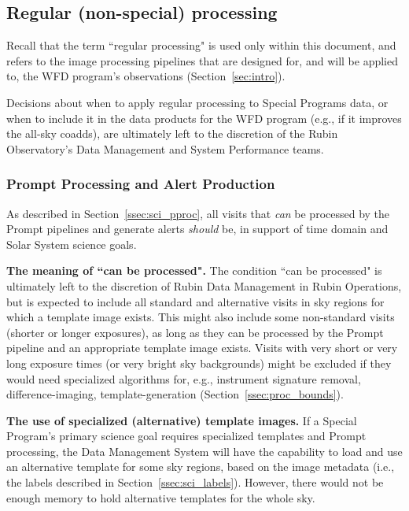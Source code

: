 \subsection{Regular (non-special) processing}\label{ssec:proc_reg}

Recall that the term ``regular processing" is used only within this document,
and refers to the image processing pipelines that are designed for, 
and will be applied to, the WFD program's observations (Section~\ref{sec:intro}).

Decisions about when to apply regular processing to Special Programs data,
or when to include it in the data products for the WFD program 
(e.g., if it improves the all-sky coadds), 
are ultimately left to the discretion of the Rubin Observatory's 
Data Management and System Performance teams.


\subsubsection{Prompt Processing and Alert Production}\label{sssec:proc_reg_prompt}

As described in Section~\ref{ssec:sci_pproc}, 
all visits that \emph{can} be processed by the Prompt pipelines and generate 
alerts \emph{should} be, in support of time domain and Solar System science goals.

\textbf{The meaning of ``can be processed".}
The condition ``can be processed" is ultimately left to the discretion of
Rubin Data Management in Rubin Operations, but is expected to include
all standard and alternative visits in sky regions for which a template image exists.
This might also include some non-standard visits (shorter or longer exposures), 
as long as they can be processed by the Prompt pipeline and an appropriate template image exists.
Visits with very short or very long exposure times (or very bright sky 
backgrounds) might be excluded if they would need specialized algorithms for,
e.g., instrument signature removal, difference-imaging, template-generation 
(Section~\ref{ssec:proc_bounds}).

\textbf{The use of specialized (alternative) template images.}
If a Special Program's primary science goal requires specialized templates and 
Prompt processing, the Data Management System will have the capability to load 
and use an alternative template for some sky regions, based on the image metadata 
(i.e., the labels described in Section~\ref{ssec:sci_labels}). 
However, there would not be enough memory to hold alternative templates 
for the whole sky.


